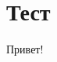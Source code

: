 \chapter{Тест}
\hypertarget{md__r_e_a_d_m_e}{}\label{md__r_e_a_d_m_e}
\label{md__r_e_a_d_m_e_autotoc_md0}%
%
Привет! 